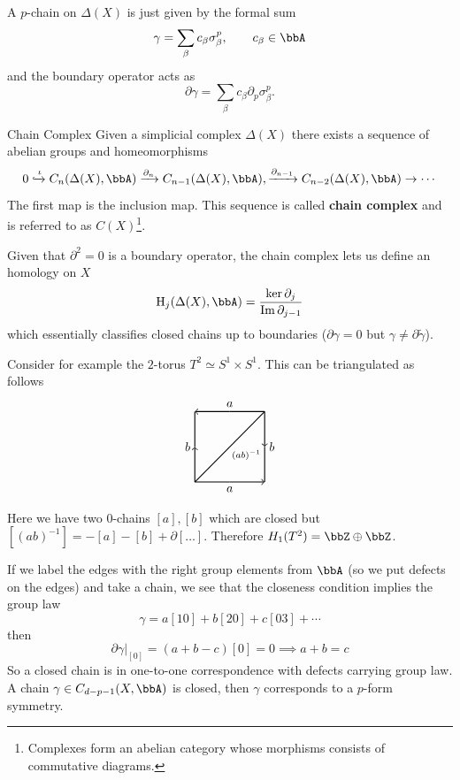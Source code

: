 A $p$-chain on $\Delta(X)$ is just given by the formal sum
\begin{equation}
	 \gamma=\sum_{\beta}c_{\beta}\sigma^{p}_{\beta},\qquad c_{\beta}\in\bbA
\end{equation}
and the boundary operator acts as
\begin{equation}
	\partial \gamma=\sum_{\beta}c_{\beta}\partial_{p}\sigma_{\beta}^{p}.
\end{equation}
\begin{defn}{Chain Complex}{}
	Given a simplicial complex $\Delta(X)$ there exists a sequence of abelian groups and homeomorphisms
	\begin{equation}
		0\xhookrightarrow{\iota} C_{n}(\Delta(X),\bbA)\xrightarrow{\partial_{n}} C_{n-1}(\Delta(X),\bbA),\xrightarrow{\partial_{n-1}}C_{n-2}(\Delta(X),\bbA)\rightarrow\cdots
	\end{equation}
	The first map is the inclusion map. This sequence is called \textbf{chain complex} and is referred to as $C(X)$\footnote{Complexes form an abelian category whose morphisms consists of commutative diagrams.}.
\end{defn}
Given that $\partial^{2}=0$ is a boundary operator, the chain complex lets us define an homology on $X$
\begin{equation}
	\HH_{j}(\Delta(X),\bbA)=\frac{\ker \partial_{j}}{\Im \partial_{j-1}}
\end{equation}
which essentially classifies closed chains up to boundaries ($\partial\gamma=0$ but $\gamma\neq\partial\tilde\gamma$).

Consider for example the $2$-torus $T^{2}\simeq S^{1}\times S^{1}$. This can be triangulated as follows
\begin{equation}
\begin{tikzpicture}[thick]
  \draw[->](0,0)--(0,1) node[anchor=east] {$b$};
  \draw[-](0,1)--(0,2);
  \draw[<-](0,2)--(1,2) node[anchor=south] {$a$};
  \draw[-](1,2)--(2,2);
  \draw[->](2,2)--(2,1)node[anchor=west] {$b$};
  \draw[-](2,1)--(2,0);
  \draw[<-](2,0)--(1,0) node[anchor=north] {$a$};
  \draw[-](1,0)--(0,0);
  \draw[-](0,0)--(2,2) node[yshift=-35, xshift=-15] {$\scriptstyle{(ab)^{-1}}$};
\end{tikzpicture}
\end{equation}
Here we have two $0$-chains $[a],[b]$ which are closed but $[(ab)^{-1}]=-[a]-[b]+\partial[\ldots]$. Therefore $H_{1}(T^{2})=\bbZ\oplus\bbZ$.

If we label the edges with the right group elements from $\bbA$ (so we put defects on the edges) and take a chain, we see that the closeness condition implies the group law
\begin{equation}
	\gamma=a[10]+b[20]+c[03]+\cdots
\end{equation}
then
\begin{equation}
	\left.\partial\gamma\right|_{[0]}=(a+b-c)[0]=0\implies a+b=c
\end{equation}
So a closed chain is in one-to-one correspondence with defects carrying group law. A chain $\gamma\in C_{d-p-1}(X,\bbA)$ is closed, then $\gamma$ corresponds to a $p$-form symmetry.

